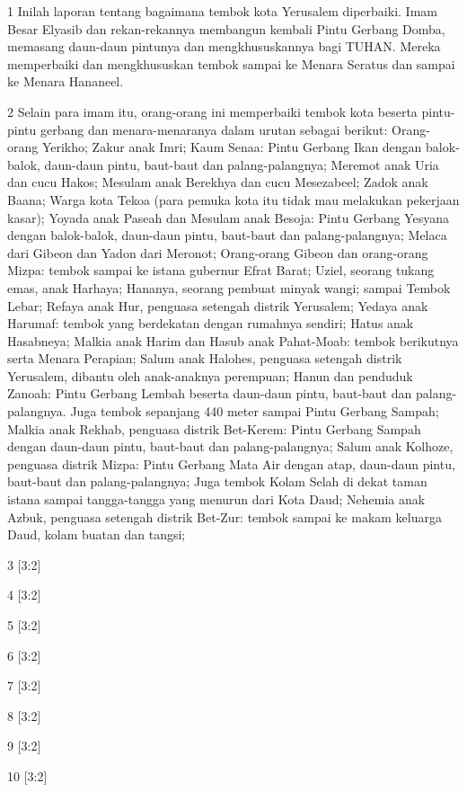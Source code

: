 \par 1 Inilah laporan tentang bagaimana tembok kota Yerusalem diperbaiki. Imam Besar Elyasib dan rekan-rekannya membangun kembali Pintu Gerbang Domba, memasang daun-daun pintunya dan mengkhususkannya bagi TUHAN. Mereka memperbaiki dan mengkhususkan tembok sampai ke Menara Seratus dan sampai ke Menara Hananeel.
\par 2 Selain para imam itu, orang-orang ini memperbaiki tembok kota beserta pintu-pintu gerbang dan menara-menaranya dalam urutan sebagai berikut: Orang-orang Yerikho; Zakur anak Imri; Kaum Senaa: Pintu Gerbang Ikan dengan balok-balok, daun-daun pintu, baut-baut dan palang-palangnya; Meremot anak Uria dan cucu Hakos; Mesulam anak Berekhya dan cucu Mesezabeel; Zadok anak Baana; Warga kota Tekoa (para pemuka kota itu tidak mau melakukan pekerjaan kasar); Yoyada anak Paseah dan Mesulam anak Besoja: Pintu Gerbang Yesyana dengan balok-balok, daun-daun pintu, baut-baut dan palang-palangnya; Melaca dari Gibeon dan Yadon dari Meronot; Orang-orang Gibeon dan orang-orang Mizpa: tembok sampai ke istana gubernur Efrat Barat; Uziel, seorang tukang emas, anak Harhaya; Hananya, seorang pembuat minyak wangi; sampai Tembok Lebar; Refaya anak Hur, penguasa setengah distrik Yerusalem; Yedaya anak Harumaf: tembok yang berdekatan dengan rumahnya sendiri; Hatus anak Hasabneya; Malkia anak Harim dan Hasub anak Pahat-Moab: tembok berikutnya serta Menara Perapian; Salum anak Halohes, penguasa setengah distrik Yerusalem, dibantu oleh anak-anaknya perempuan; Hanun dan penduduk Zanoah: Pintu Gerbang Lembah beserta daun-daun pintu, baut-baut dan palang-palangnya. Juga tembok sepanjang 440 meter sampai Pintu Gerbang Sampah; Malkia anak Rekhab, penguasa distrik Bet-Kerem: Pintu Gerbang Sampah dengan daun-daun pintu, baut-baut dan palang-palangnya; Salum anak Kolhoze, penguasa distrik Mizpa: Pintu Gerbang Mata Air dengan atap, daun-daun pintu, baut-baut dan palang-palangnya; Juga tembok Kolam Selah di dekat taman istana sampai tangga-tangga yang menurun dari Kota Daud; Nehemia anak Azbuk, penguasa setengah distrik Bet-Zur: tembok sampai ke makam keluarga Daud, kolam buatan dan tangsi;
\par 3 [3:2]
\par 4 [3:2]
\par 5 [3:2]
\par 6 [3:2]
\par 7 [3:2]
\par 8 [3:2]
\par 9 [3:2]
\par 10 [3:2]
